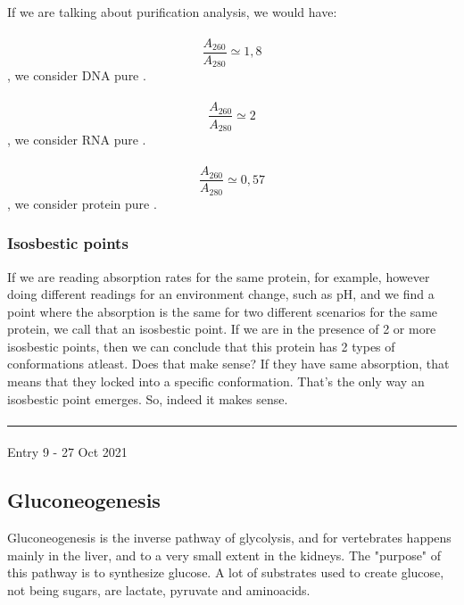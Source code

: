 \documentclass[12pt,  letterpaper]{article}
\begin{document}
\paragraph*{}
If we are talking about purification analysis, we would have:
\paragraph*{}
$$\frac{A_{260}}{A_{280}} \simeq 1,8$$ , we consider DNA pure	.
\paragraph*{}
$$\frac{A_{260}}{A_{280}} \simeq 2$$ , we consider RNA pure	.
\paragraph*{}
$$\frac{A_{260}}{A_{280}} \simeq 0,57$$ , we consider protein pure	.
\paragraph*{}
\subsubsection*{Isosbestic points}
If we are reading absorption rates for the same protein, for example, however doing different readings for an environment change, such as pH, and we find a point where the absorption is the same for two different scenarios for the same protein, we call that an isosbestic point. If we are in the presence of 2 or more isosbestic points, then we can conclude that this protein has 2 types of conformations atleast. Does that make sense? If they have same absorption, that means that they locked into a specific conformation. That's the only way an isosbestic point emerges. So, indeed it makes sense.
\paragraph*{}
\hrule
\paragraph*{}
Entry 9 - 27 Oct 2021
\subsection*{Gluconeogenesis}
Gluconeogenesis is the inverse pathway of glycolysis, and for vertebrates happens mainly in the liver, and to a very small extent in the kidneys. The "purpose" of this pathway is to synthesize glucose. A lot of substrates used to create glucose, not being sugars, are lactate, pyruvate and aminoacids. 
\end{document}
